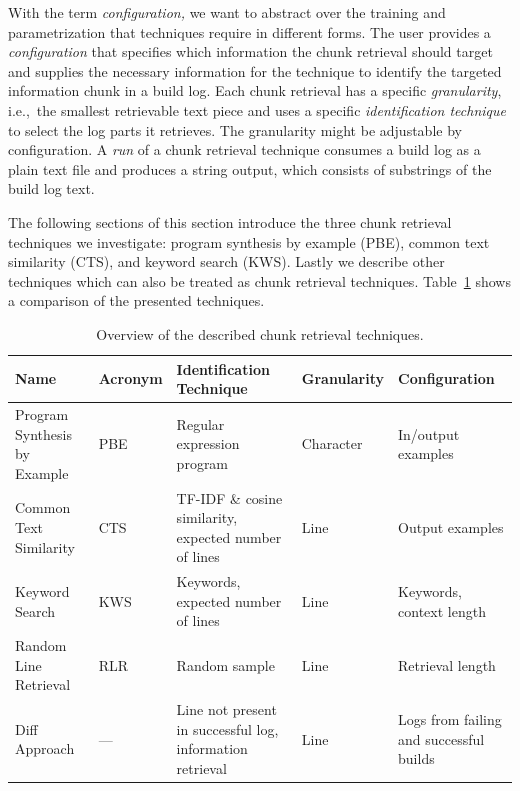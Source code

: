 With the term \textit{configuration,} we want to abstract over the training and parametrization that techniques require in different forms.
The user provides a \textit{configuration} that specifies which information the chunk retrieval should target and supplies the necessary information for the technique to identify the targeted information chunk in a build log.
Each chunk retrieval has a specific \textit{granularity}, i.e.,\ the smallest retrievable text piece and uses a specific \textit{identification technique} to select the log parts it retrieves. The granularity might be adjustable by configuration.
A \emph{run} of a chunk retrieval technique consumes a build log as a plain text file and produces a string output, which consists of substrings of the build log text.

The following sections of this section introduce the three chunk retrieval techniques we investigate: program synthesis by example (PBE), common text similarity (CTS), and keyword search (KWS).
Lastly we describe other techniques which can also be treated as chunk retrieval techniques.
Table~\ref{tab:ctr} shows a comparison of the presented techniques.

\begin{table}[]
\centering
\caption{Overview of the described chunk retrieval techniques.}
\begin{tabularx}{\columnwidth}{@{}XlXlX@{}} 
\toprule
Name                         & Acronym & Identification Technique                                   & Granularity & Configuration             \\ 
\midrule
Program Synthesis by Example & PBE     & Regular expression program                                 & Character   & In/output examples      \\
Common Text Similarity       & CTS     & TF-IDF \& cosine similarity, expected number of lines & Line        & Output examples           \\
Keyword Search               & KWS     & Keywords, expected number of lines                    & Line        & Keywords, context length  \\
Random Line Retrieval        & RLR     & Random sample                                              & Line        & Retrieval length          \\
Diff Approach                & ---     & Line not present in successful log, information retrieval  & Line        & Logs from failing and successful builds      \\
\bottomrule
\end{tabularx}
\label{tab:ctr}
\end{table}


